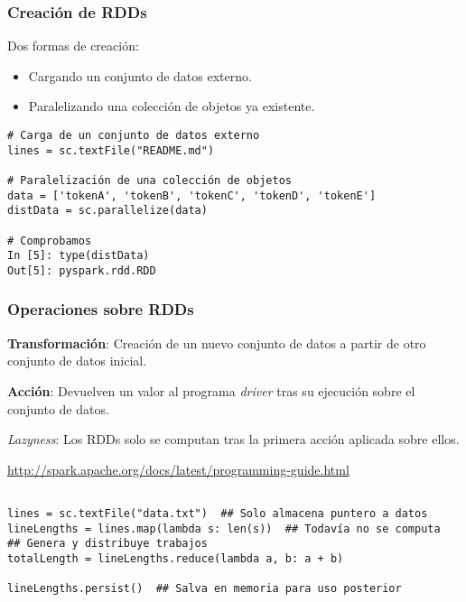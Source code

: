 
\begin{frame}[fragile]
 \frametitle{Creación de RDDs}
 
 \begin{wideitemize}
  \item Dos formas de creación:
      \begin{itemize}
       \item Cargando un conjunto de datos externo.
       \item Paralelizando una colección de objetos ya existente.
      \end{itemize}

    \end{wideitemize}
  \fontsize{8pt}{12pt}\selectfont
  \begin{verbatim}
# Carga de un conjunto de datos externo
lines = sc.textFile("README.md")

# Paralelización de una colección de objetos
data = ['tokenA', 'tokenB', 'tokenC', 'tokenD', 'tokenE']
distData = sc.parallelize(data)

# Comprobamos
In [5]: type(distData)
Out[5]: pyspark.rdd.RDD

  \end{verbatim}

\end{frame}


\begin{frame}[fragile]
 \frametitle{Operaciones sobre RDDs}
 
 \begin{wideitemize}

   \item \textbf{Transformación}: Creación de un nuevo conjunto de datos a partir
   de otro conjunto de datos inicial.
   \item \textbf{Acción}: Devuelven un valor al programa \textit{driver} tras
   su ejecución sobre el conjunto de datos.
   
  \item \textit{Lazyness}: Los RDDs solo se computan tras la primera acción
  aplicada sobre ellos.

  \item \url{http://spark.apache.org/docs/latest/programming-guide.html}

    \end{wideitemize}
  \fontsize{8pt}{12pt}\selectfont
  \begin{verbatim}
  
lines = sc.textFile("data.txt")  ## Solo almacena puntero a datos
lineLengths = lines.map(lambda s: len(s))  ## Todavía no se computa
## Genera y distribuye trabajos
totalLength = lineLengths.reduce(lambda a, b: a + b)

lineLengths.persist()  ## Salva en memoria para uso posterior

  \end{verbatim}

\end{frame}

